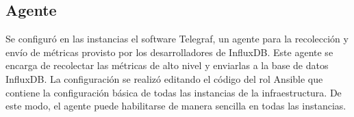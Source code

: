 %
\subsection{Agente}
%
Se configuró en las instancias el software Telegraf, un agente para la
recolección y envío de métricas provisto por los desarrolladores de
InfluxDB. Este agente se encarga de recolectar las métricas de alto
nivel y enviarlas a la base de datos InfluxDB. La configuración se
realizó editando el código del rol Ansible que contiene la
configuración básica de todas las instancias de la infraestructura. De
este modo, el agente puede habilitarse de manera sencilla en todas las
instancias.
